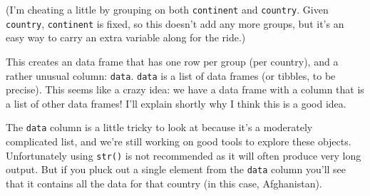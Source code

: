 \documentclass[]{book}
\newenvironment{Shaded}{\begin{snugshade}}{\end{snugshade}}
\newcommand{\KeywordTok}[1]{\textcolor[rgb]{0.13,0.29,0.53}{\textbf{{#1}}}}
\newcommand{\DecValTok}[1]{\textcolor[rgb]{0.00,0.00,0.81}{{#1}}}
\newcommand{\StringTok}[1]{\textcolor[rgb]{0.31,0.60,0.02}{{#1}}}
\newcommand{\CommentTok}[1]{\textcolor[rgb]{0.56,0.35,0.01}{\textit{{#1}}}}
\newcommand{\NormalTok}[1]{{#1}}
\begin{document}
\begin{Shaded}
\end{Shaded}

(I'm cheating a little by grouping on both \texttt{continent} and
\texttt{country}. Given \texttt{country}, \texttt{continent} is fixed,
so this doesn't add any more groups, but it's an easy way to carry an
extra variable along for the ride.)

This creates an data frame that has one row per group (per country), and
a rather unusual column: \texttt{data}. \texttt{data} is a list of data
frames (or tibbles, to be precise). This seems like a crazy idea: we
have a data frame with a column that is a list of other data frames!
I'll explain shortly why I think this is a good idea.

The \texttt{data} column is a little tricky to look at because it's a
moderately complicated list, and we're still working on good tools to
explore these objects. Unfortunately using \texttt{str()} is not
recommended as it will often produce very long output. But if you pluck
out a single element from the \texttt{data} column you'll see that it
contains all the data for that country (in this case, Afghanistan).

\begin{Shaded}
\end{Shaded}
\end{document}

